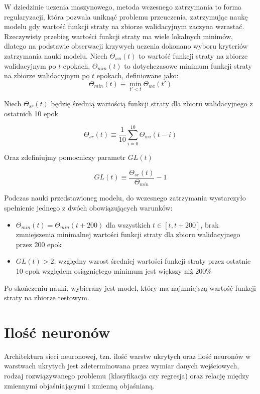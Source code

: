 \documentclass[]{article}
\theoremstyle{definition}
\begin{document}
W dziedzinie uczenia maszynowego, metoda wczesnego zatrzymania to forma regularyzacji, która pozwala uniknąć problemu przeuczenia, zatrzymując naukę modelu gdy wartość funkcji straty na zbiorze walidacyjnym zaczyna wzrastać. Rzeczywisty przebieg wartości funkcji straty ma wiele lokalnych minimów, dlatego na podstawie obserwacji krzywych uczenia dokonano wyboru kryteriów zatrzymania nauki modelu. 
 Niech $\Theta_{wa}(t)$ to wartość funkcji straty na zbiorze walidacyjnym po $t$ epokach, $\Theta_{min}(t)$ to dotychczasowe minimum funkcji straty na zbiorze walidacyjnym po $t$ epokach, definiowane jako:
 $$
 \Theta_{min}(t) \equiv \min_{t' < t} \Theta_{wa}(t')
 $$
 
 Niech $\Theta_{sr}(t)$ będzię średnią wartością funkcji straty dla zbioru walidacyjnego z ostatnich 10 epok.
 
 $$
 \Theta_{sr}(t) \equiv \frac{1}{10} \sum_{i=0}^{10} \Theta_{wa}(t-i)
 $$
 
 Oraz zdefiniujmy pomocniczy parametr $GL(t)$
 
 
 $$
 GL(t) \equiv \frac{\Theta_{sr}(t)}{\Theta_{min}} - 1
 $$
 
 
 Podczas nauki przedstawioneg modelu, do wczesnego zatrzymania wystarczyło spełnienie jednego z dwóch obowiązujących warunków:

\begin{itemize}
\item $\Theta_{min}(t) = \Theta_{min}(t+ 200)$ dla wszystkich $t \in [t,t+200]$, brak zmniejszenia minimalnej wartości funkcji straty dla zbioru walidacyjnego przez 200 epok 
\item $ GL(t)  > 2$, względny wzrost średniej wartości funkcji straty przez ostatnie 10 epok względem osiągniętego minimum jest większy niż $200\%$
\end{itemize}

Po skończeniu nauki, wybierany jest model, który ma najmniejszą wartość funkcji straty na zbiorze testowym.

\section{Ilość neuronów}

Architektura sieci neuronowej, tzn. ilość warstw ukrytych oraz ilość neuronów w warstwach ukrytych jest zdeterminowana przez wymiar danych wejściowych, rodzaj rozwiązywanego problemu (klasyfikacja czy regresja) oraz relację między zmiennymi objaśniającymi i zmienną objaśnianą.
\end{document}
